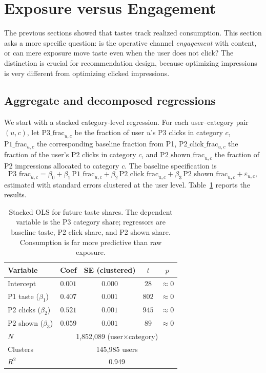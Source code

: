 \documentclass[11pt]{article}
\begin{document}
\section{Exposure versus Engagement}
\label{sec:exposure}

The previous sections showed that tastes track realized consumption. This section asks a more specific question: is the operative channel \emph{engagement} with content, or can mere exposure move taste even when the user does not click? The distinction is crucial for recommendation design, because optimizing impressions is very different from optimizing clicked impressions.

\subsection{Aggregate and decomposed regressions}

We start with a stacked category-level regression. For each user--category pair $(u,c)$, let $\text{P3\_frac}_{u,c}$ be the fraction of user $u$'s P3 clicks in category $c$, $\text{P1\_frac}_{u,c}$ the corresponding baseline fraction from P1, $\text{P2\_click\_frac}_{u,c}$ the fraction of the user's P2 clicks in category $c$, and $\text{P2\_shown\_frac}_{u,c}$ the fraction of P2 impressions allocated to category $c$. The baseline specification is
\[
\text{P3\_frac}_{u,c}
=
\beta_0
+
\beta_1\,\text{P1\_frac}_{u,c}
+
\beta_2\,\text{P2\_click\_frac}_{u,c}
+
\beta_3\,\text{P2\_shown\_frac}_{u,c}
+
\varepsilon_{u,c},
\]
estimated with standard errors clustered at the user level. Table~\ref{tab:stacked_ols} reports the results.

\begin{table}[ht]
\centering
\caption{Stacked OLS for future taste shares. The dependent variable is the P3 category share; regressors are baseline taste, P2 click share, and P2 shown share. Consumption is far more predictive than raw exposure.}
\label{tab:stacked_ols}
\begin{tabular}{lcccc}
\toprule
Variable & Coef & SE (clustered) & $t$ & $p$ \\
\midrule
Intercept & $0.001$ & $0.000$ & $28$ & $\approx 0$ \\
P1 taste ($\beta_1$) & $0.407$ & $0.001$ & $802$ & $\approx 0$ \\
P2 clicks ($\beta_2$) & $0.521$ & $0.001$ & $945$ & $\approx 0$ \\
P2 shown ($\beta_3$) & $0.059$ & $0.001$ & $89$ & $\approx 0$ \\
\midrule
$N$ & \multicolumn{4}{c}{1,852,089 (user$\times$category)} \\
Clusters & \multicolumn{4}{c}{145,985 users} \\
$R^2$ & \multicolumn{4}{c}{0.949} \\
\bottomrule
\end{tabular}
\end{table}
\FloatBarrier
\end{document}
